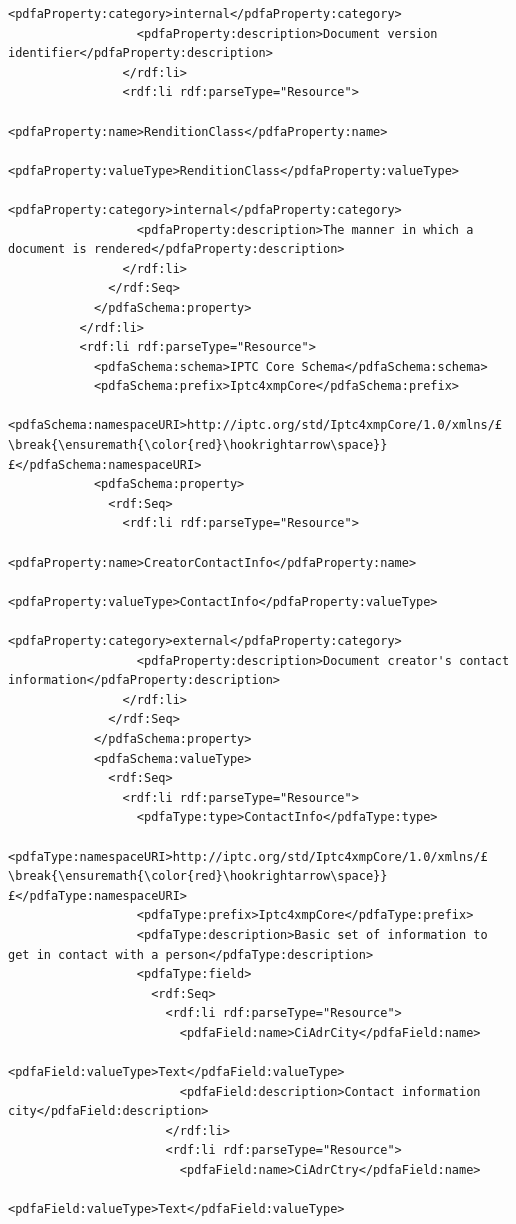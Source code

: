 \begin{lstlisting}[style=myXML,
caption={Second part of the XML metadata embedded in a PDF file (some reformatting has been done to fit the text in the boarders)}, label={lst:pdfinfoOutputPart2}]
                  <pdfaProperty:category>internal</pdfaProperty:category>
                  <pdfaProperty:description>Document version identifier</pdfaProperty:description>
                </rdf:li>
                <rdf:li rdf:parseType="Resource">
                  <pdfaProperty:name>RenditionClass</pdfaProperty:name>
                  <pdfaProperty:valueType>RenditionClass</pdfaProperty:valueType>
                  <pdfaProperty:category>internal</pdfaProperty:category>
                  <pdfaProperty:description>The manner in which a document is rendered</pdfaProperty:description>
                </rdf:li>
              </rdf:Seq>
            </pdfaSchema:property>
          </rdf:li>
          <rdf:li rdf:parseType="Resource">
            <pdfaSchema:schema>IPTC Core Schema</pdfaSchema:schema>
            <pdfaSchema:prefix>Iptc4xmpCore</pdfaSchema:prefix>
            <pdfaSchema:namespaceURI>http://iptc.org/std/Iptc4xmpCore/1.0/xmlns/£\break{\ensuremath{\color{red}\hookrightarrow\space}}£</pdfaSchema:namespaceURI>
            <pdfaSchema:property>
              <rdf:Seq>
                <rdf:li rdf:parseType="Resource">
                  <pdfaProperty:name>CreatorContactInfo</pdfaProperty:name>
                  <pdfaProperty:valueType>ContactInfo</pdfaProperty:valueType>
                  <pdfaProperty:category>external</pdfaProperty:category>
                  <pdfaProperty:description>Document creator's contact information</pdfaProperty:description>
                </rdf:li>
              </rdf:Seq>
            </pdfaSchema:property>
            <pdfaSchema:valueType>
              <rdf:Seq>
                <rdf:li rdf:parseType="Resource">
                  <pdfaType:type>ContactInfo</pdfaType:type>
                  <pdfaType:namespaceURI>http://iptc.org/std/Iptc4xmpCore/1.0/xmlns/£\break{\ensuremath{\color{red}\hookrightarrow\space}}£</pdfaType:namespaceURI>
                  <pdfaType:prefix>Iptc4xmpCore</pdfaType:prefix>
                  <pdfaType:description>Basic set of information to get in contact with a person</pdfaType:description>
                  <pdfaType:field>
                    <rdf:Seq>
                      <rdf:li rdf:parseType="Resource">
                        <pdfaField:name>CiAdrCity</pdfaField:name>
                        <pdfaField:valueType>Text</pdfaField:valueType>
                        <pdfaField:description>Contact information city</pdfaField:description>
                      </rdf:li>
                      <rdf:li rdf:parseType="Resource">
                        <pdfaField:name>CiAdrCtry</pdfaField:name>
                        <pdfaField:valueType>Text</pdfaField:valueType>

\end{lstlisting}
